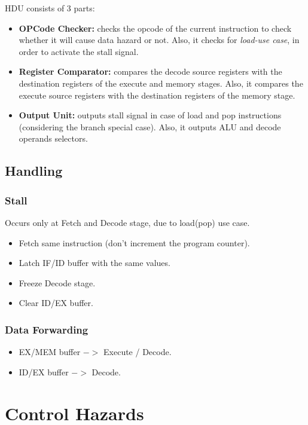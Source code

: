 HDU consists of 3 parts:
\begin{itemize}
    \item \textbf{OPCode Checker:} checks the opcode of the current instruction to check whether it will cause data hazard or not. Also, it checks for \emph{load-use case}, in order to activate the stall signal.
    \item \textbf{Register Comparator:} compares the decode source registers with the destination registers of the execute and memory stages. Also, it compares the execute source registers with the destination registers of the memory stage.
    \item \textbf{Output Unit:} outputs stall signal in case of load and pop instructions (considering the branch special case). Also, it outputs ALU and decode operands selectors. 
\end{itemize}

\subsection{Handling}

\subsubsection{Stall}
Occurs only at Fetch and Decode stage, due to load(pop) use case.
\begin{itemize}
    \item Fetch same instruction (don't increment the program counter).
    \item Latch IF/ID buffer with the same values.
    \item Freeze Decode stage.
    \item Clear ID/EX buffer.
\end{itemize}

\subsubsection{Data Forwarding}
\begin{itemize}
    \item EX/MEM buffer $->$ Execute / Decode.
    \item ID/EX buffer $->$ Decode.
\end{itemize}

\section{Control Hazards}

